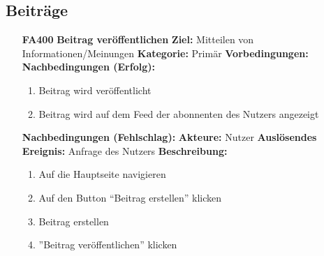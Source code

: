 \documentclass[parskip=full]{scrartcl}
\begin{document}
		\subsection{Beiträge} \label{sec:FABeiträge}
		\begin{itemize}[nosep]
			\item[\textbf{FA400}]\textbf{Beitrag veröffentlichen}
			\newline \textbf{Ziel:} Mitteilen von Informationen/Meinungen
			\newline \textbf{Kategorie:} Primär
			\newline \textbf{Vorbedingungen:}
			\newline \textbf{Nachbedingungen (Erfolg):}
			\begin{enumerate}[nosep]
				\item Beitrag wird  veröffentlicht
				\item Beitrag wird auf dem \gls{Feed} der abonnenten des Nutzers angezeigt
			\end{enumerate}
			\textbf{Nachbedingungen (Fehlschlag):}
			\newline \textbf{Akteure:} Nutzer
			\newline \textbf{Auslösendes Ereignis:} Anfrage des Nutzers
			\newline \textbf{Beschreibung:}
			\begin{enumerate}[nosep]
				\item Auf die Hauptseite navigieren
				\item Auf den \gls{Button} “Beitrag erstellen” klicken
				\item Beitrag erstellen
				\item ”Beitrag veröffentlichen” klicken\\
			\end{enumerate}
			

\end{itemize}
\end{document}
